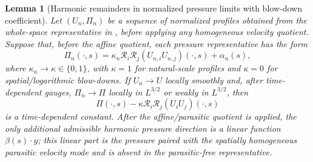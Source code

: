 \documentclass[11pt]{amsart}
\numberwithin{equation}{section}
\theoremstyle{plain}
\newtheorem{lemma}[lemma]{Lemma}
\theoremstyle{definition}
\theoremstyle{remark}
\begin{document}
\begin{lemma}[Harmonic remainders in normalized pressure limits with blow-down coefficient]
\label{lem:local-harmonic-remainders-affine}
Let \((U_n,\Pi_n)\) be a sequence of normalized profiles obtained from the
whole-space representative in
, before applying any
homogeneous velocity quotient.  Suppose that, before the affine quotient, each
pressure representative has the form
\[
   \Pi_n(\cdot,s)
   =
   \kappa_n\mathcal R_i\mathcal R_j(U_{n,i}U_{n,j})(\cdot,s)+\alpha_n(s),
\]
where \(\kappa_n\to\kappa\in\{0,1\}\), with \(\kappa=1\) for natural-scale
profiles and \(\kappa=0\) for spatial/logarithmic blow-downs.  If
\(U_n\to U\) locally smoothly and, after time-dependent gauges,
\(\Pi_n\to\Pi\) locally in \(L^{3/2}\) or weakly in \(L^{3/2}\), then
\[
   \Pi(\cdot,s)-\kappa\mathcal R_i\mathcal R_j(U_iU_j)(\cdot,s)
\]
is a time-dependent constant.  After the affine/parasitic quotient is applied,
the only additional admissible harmonic pressure direction is a linear function
\(\beta(s)\cdot y\); this linear part is the pressure paired with the
spatially homogeneous parasitic velocity mode and is absent in the
parasitic-free representative.
\end{lemma}
\end{document}

